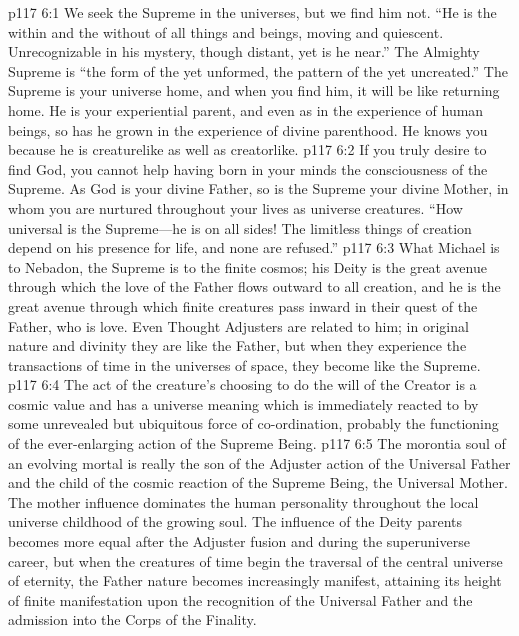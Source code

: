 \vs p117 6:1 We seek the Supreme in the universes, but we find him not. “He is the within and the without of all things and beings, moving and quiescent. Unrecognizable in his mystery, though distant, yet is he near.” The Almighty Supreme is “the form of the yet unformed, the pattern of the yet uncreated.” The Supreme is your universe home, and when you find him, it will be like returning home. He is your experiential parent, and even as in the experience of human beings, so has he grown in the experience of divine parenthood. He knows you because he is creaturelike as well as creatorlike.
\vs p117 6:2 If you truly desire to find God, you cannot help having born in your minds the consciousness of the Supreme. As God is your divine Father, so is the Supreme your divine Mother, in whom you are nurtured throughout your lives as universe creatures. “How universal is the Supreme---he is on all sides! The limitless things of creation depend on his presence for life, and none are refused.”
\vs p117 6:3 What Michael is to Nebadon, the Supreme is to the finite cosmos; his Deity is the great avenue through which the love of the Father flows outward to all creation, and he is the great avenue through which finite creatures pass inward in their quest of the Father, who is love. Even Thought Adjusters are related to him; in original nature and divinity they are like the Father, but when they experience the transactions of time in the universes of space, they become like the Supreme.
\pc \vs p117 6:4 The act of the creature’s choosing to do the will of the Creator is a cosmic value and has a universe meaning which is immediately reacted to by some unrevealed but ubiquitous force of co\hyp{}ordination, probably the functioning of the ever\hyp{}enlarging action of the Supreme Being.
\vs p117 6:5 The morontia soul of an evolving mortal is really the son of the Adjuster action of the Universal Father and the child of the cosmic reaction of the Supreme Being, the Universal Mother. The mother influence dominates the human personality throughout the local universe childhood of the growing soul. The influence of the Deity parents becomes more equal after the Adjuster fusion and during the superuniverse career, but when the creatures of time begin the traversal of the central universe of eternity, the Father nature becomes increasingly manifest, attaining its height of finite manifestation upon the recognition of the Universal Father and the admission into the Corps of the Finality.
